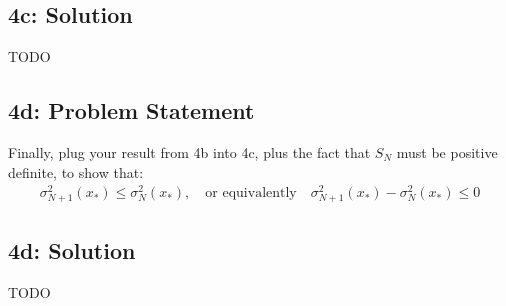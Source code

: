 \documentclass[12pt]{article}
\newcommand{\officialdirections}[1]{{\color{blue} #1}}
\begin{document}
\subsection{4c: Solution}
TODO


\newpage
\officialdirections{
\subsection*{4d: Problem Statement}
Finally, plug your result from 4b into 4c, plus the fact that $S_N$ must be positive definite, to show that:
\begin{align}
\sigma_{N+1}^2(x_*) \leq \sigma_N^2(x_*), \quad \text{or equivalently} \quad \sigma_{N+1}^2(x_*) - \sigma_N^2(x_*) \leq 0
\end{align}
}

\subsection{4d: Solution}
TODO
\end{document}
